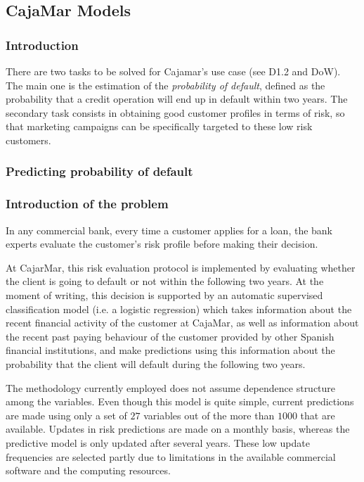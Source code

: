 \subsection{CajaMar Models}
\label{Section:CajaMarModels}

\subsubsection{Introduction}

There are two tasks to be solved for Cajamar's use case (see D1.2 and DoW). The main one is
the estimation of the \emph{probability of default}, defined as the probability that a
credit operation will end up in default within two years. The secondary task consists in obtaining 
good customer profiles in terms of risk, so that marketing campaigns can be
specifically targeted to these low risk customers. 

\subsubsection{Predicting probability of default}
\label{SubSection:Predicting}

\subsubsection*{Introduction of the problem} 

In any commercial bank, every time a customer applies for a loan, the bank experts evaluate the customer's risk profile before making their decision. 

At CajarMar, this risk evaluation protocol is implemented by evaluating whether the client is going to default or not within the following two years. At the moment of writing, this decision is supported by an automatic supervised classification model (i.e. a logistic regression) which takes information about the recent financial activity of the customer at CajaMar, as well as information about the recent past paying behaviour of the customer provided by other Spanish financial institutions, and make predictions using this information about the probability that the client will default during the following two years.

The methodology currently employed does not assume dependence structure among the variables. Even though this model is quite simple, current predictions are made using only a set of $27$ variables out of the more than $1000$ that are available. Updates in risk predictions are made on a monthly basis, whereas the predictive model is only updated after several years. These low update frequencies are selected partly due to limitations in the available commercial software and the computing resources.

